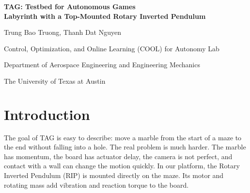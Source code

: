 \documentclass[9pt]{extarticle}
\begin{document}
\begin{center}
{\LARGE\bfseries\color{tagblue} TAG: Testbed for Autonomous Games \\[2pt] Labyrinth with a Top-Mounted Rotary Inverted Pendulum}\par
\vspace{5pt}
{\large Trung Bao Truong, Thanh Dat Nguyen}\par
{\small Control, Optimization, and Online Learning (COOL) for Autonomy Lab}\par
{\small Department of Aerospace Engineering and Engineering Mechanics}\par
{\small The University of Texas at Austin}\par
\end{center}

\begin{abstract}
TAG is a real labyrinth robot designed for reinforcement-learning experiments. Two servos tilt the maze, a camera tracks the marble, and a rotary inverted pendulum is mounted at the center of the board. The pendulum makes the task more challenging because its motion introduces reaction torque and vibration into the same structure that controls the marble. DreamerV3 serves as the high-level maze controller. It receives the maze image, board angles, marble position and measured velocity, future path points, and optional pendulum data. Its actions are converted into desired pitch and roll angles for the two maze servos. This paper explains how the learning algorithm is connected to the physical hardware, which neural-network components are used within DreamerV3, why its recurrent world model is currently preferred over a Transformer, and what was learned from the initial training run. We also developed an integrated NVIDIA Isaac Sim environment that models the labyrinth, marble, tilting board, and top-mounted rotary inverted pendulum within the same rigid-body simulation. This environment enables the maze controller to be trained and evaluated while pendulum motion disturbs the supporting board. Simulation accelerates experience collection and permits early policy exploration without motor heating, cooldown periods, mechanical wear, repeated manual resets, or risk to the physical platform. Because actuator delay, friction, contact, sensor noise, structural compliance, and vibration cannot be reproduced perfectly, simulated pretraining is followed by system identification and hardware fine-tuning.
\end{abstract}

\section{Introduction}
The goal of TAG is easy to describe: move a marble from the start of a maze to the end without falling into a hole. The real problem is much harder. The marble has momentum, the board has actuator delay, the camera is not perfect, and contact with a wall can change the motion quickly. In our platform, the Rotary Inverted Pendulum (RIP) is mounted directly on the maze. Its motor and rotating mass add vibration and reaction torque to the board.
\end{document}
